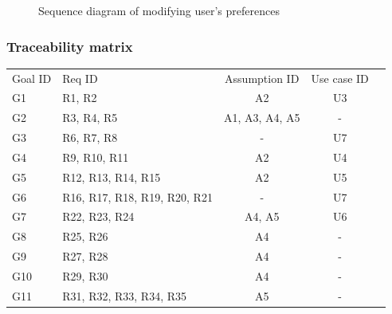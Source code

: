 \documentclass[12pt,titlepage]{article}
\begin{document}
\begin{figure}
\centering
{}
\caption{Sequence diagram of modifying user's preferences}
\end{figure}

\clearpage
\newpage

 \subsubsection{Traceability matrix}
\begin{tabular}{llccr}
\rowcolor{red}
Goal ID & Req ID & Assumption ID & Use case ID \\
\rowcolor{lightgray}
 G1 &R1, R2 & A2&  U3 \\
\rowcolor{anti-flashwhite}
G2 & R3, R4, R5 & A1, A3, A4, A5& -\\
\rowcolor{lightgray}
G3 & R6, R7, R8 & - & U7 \\
\rowcolor{anti-flashwhite}
G4 & R9, R10, R11 & A2 & U4 \\
\rowcolor{lightgray}
G5 & R12, R13, R14, R15 & A2& U5 \\
\rowcolor{anti-flashwhite}
G6 & R16, R17, R18, R19, R20, R21 & - &  U7 \\
\rowcolor{lightgray}
G7 & R22, R23, R24 &A4, A5& U6 \\
\rowcolor{anti-flashwhite}
G8 & R25, R26 & A4& - \\
\rowcolor{lightgray}
G9 & R27, R28 & A4& - \\
\rowcolor{anti-flashwhite}
G10 & R29, R30& A4& - \\
\rowcolor{lightgray}
G11 & R31, R32, R33, R34, R35 & A5&- 
\end{tabular}
\end{document}
